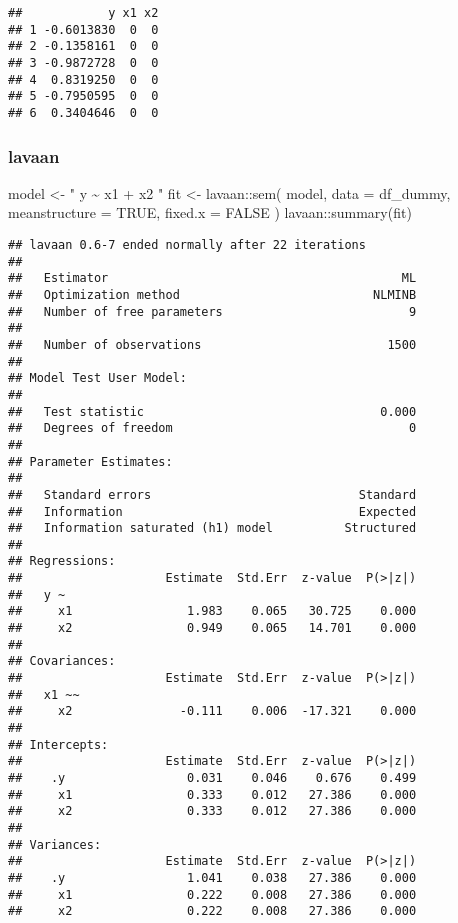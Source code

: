 \documentclass[
]{book}
\newenvironment{Shaded}{\begin{snugshade}}{\end{snugshade}}
\newcommand{\AttributeTok}[1]{\textcolor[rgb]{0.77,0.63,0.00}{#1}}
\newcommand{\ConstantTok}[1]{\textcolor[rgb]{0.00,0.00,0.00}{#1}}
\newcommand{\FunctionTok}[1]{\textcolor[rgb]{0.00,0.00,0.00}{#1}}
\newcommand{\NormalTok}[1]{#1}
\newcommand{\OtherTok}[1]{\textcolor[rgb]{0.56,0.35,0.01}{#1}}
\newcommand{\SpecialCharTok}[1]{\textcolor[rgb]{0.00,0.00,0.00}{#1}}
\newcommand{\StringTok}[1]{\textcolor[rgb]{0.31,0.60,0.02}{#1}}
\theoremstyle{definition}
\theoremstyle{definition}
\theoremstyle{definition}
\theoremstyle{remark}
\begin{document}
\begin{verbatim}
##            y x1 x2
## 1 -0.6013830  0  0
## 2 -0.1358161  0  0
## 3 -0.9872728  0  0
## 4  0.8319250  0  0
## 5 -0.7950595  0  0
## 6  0.3404646  0  0
\end{verbatim}

\hypertarget{lavaan-lavaan2012-1}{%
\subsubsection{\texorpdfstring{lavaan \citep{lavaan2012}}{lavaan {[}@lavaan2012{]}}}\label{lavaan-lavaan2012-1}}

\begin{Shaded}
\begin{Highlighting}[]
\NormalTok{model }\OtherTok{\textless{}{-}} \StringTok{"}
\StringTok{  y \textasciitilde{} x1 + x2}
\StringTok{"}
\NormalTok{fit }\OtherTok{\textless{}{-}}\NormalTok{ lavaan}\SpecialCharTok{::}\FunctionTok{sem}\NormalTok{(}
\NormalTok{  model,}
  \AttributeTok{data =}\NormalTok{ df\_dummy,}
  \AttributeTok{meanstructure =} \ConstantTok{TRUE}\NormalTok{,}
  \AttributeTok{fixed.x =} \ConstantTok{FALSE}
\NormalTok{)}
\NormalTok{lavaan}\SpecialCharTok{::}\FunctionTok{summary}\NormalTok{(fit)}
\end{Highlighting}
\end{Shaded}

\begin{verbatim}
## lavaan 0.6-7 ended normally after 22 iterations
## 
##   Estimator                                         ML
##   Optimization method                           NLMINB
##   Number of free parameters                          9
##                                                       
##   Number of observations                          1500
##                                                       
## Model Test User Model:
##                                                       
##   Test statistic                                 0.000
##   Degrees of freedom                                 0
## 
## Parameter Estimates:
## 
##   Standard errors                             Standard
##   Information                                 Expected
##   Information saturated (h1) model          Structured
## 
## Regressions:
##                    Estimate  Std.Err  z-value  P(>|z|)
##   y ~                                                 
##     x1                1.983    0.065   30.725    0.000
##     x2                0.949    0.065   14.701    0.000
## 
## Covariances:
##                    Estimate  Std.Err  z-value  P(>|z|)
##   x1 ~~                                               
##     x2               -0.111    0.006  -17.321    0.000
## 
## Intercepts:
##                    Estimate  Std.Err  z-value  P(>|z|)
##    .y                 0.031    0.046    0.676    0.499
##     x1                0.333    0.012   27.386    0.000
##     x2                0.333    0.012   27.386    0.000
## 
## Variances:
##                    Estimate  Std.Err  z-value  P(>|z|)
##    .y                 1.041    0.038   27.386    0.000
##     x1                0.222    0.008   27.386    0.000
##     x2                0.222    0.008   27.386    0.000
\end{verbatim}
\end{document}
